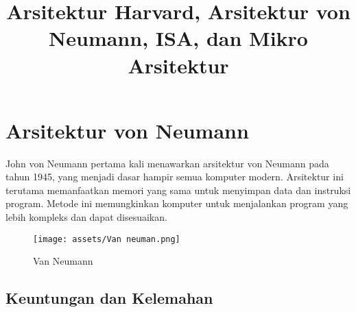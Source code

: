 \documentclass{article}
\title{Arsitektur Harvard, Arsitektur von Neumann, ISA, dan Mikro Arsitektur}
\author{}
\date{}
\begin{document}
\maketitle



\section{Arsitektur von Neumann}
John von Neumann pertama kali menawarkan arsitektur von Neumann pada tahun 1945, yang menjadi dasar hampir semua komputer modern. Arsitektur ini terutama memanfaatkan memori yang sama untuk menyimpan data dan instruksi program. Metode ini memungkinkan komputer untuk menjalankan program yang lebih kompleks dan dapat disesuaikan.
\begin{figure}
    \centering
    \texttt{[image: assets/Van neuman.png]}
    \caption{Van Neumann}
    \label{fig:enter-label}
\end{figure}
\subsection{Keuntungan dan Kelemahan}
\end{document}
